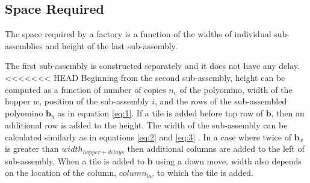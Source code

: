 \subsection{Space Required}\label{sec:requiredSpace}
The space required by a factory is a function of the widths of individual sub-assemblies and height of the last sub-assembly.


The first sub-assembly is constructed separately and it does not have any delay.
<<<<<<< HEAD
Beginning from the second sub-assembly, height can be computed as a function of number of copies $n_c$ of the polyomino, width of the hopper $w$, position of the sub-assembly $i$, and the rows of the sub-assembled polyomino $\mathbf{b}_y$ as in equation \ref{eq:1}. If a tile is added before top row of $\mathbf{b}$, then an additional row is added to the height.
The width of the sub-assembly can be calculated similarly as in equations \ref{eq:2} and \ref{eq:3} . 
In a case where twice of $\mathbf{b}_x$ is greater than $width_{hopper+delays}$ then additional columns are added to the left of sub-assembly. 
When a tile is added to $\mathbf{b}$ using a down move, width also depends on the location of the column, $column_{loc}$ to which the tile is added.  


